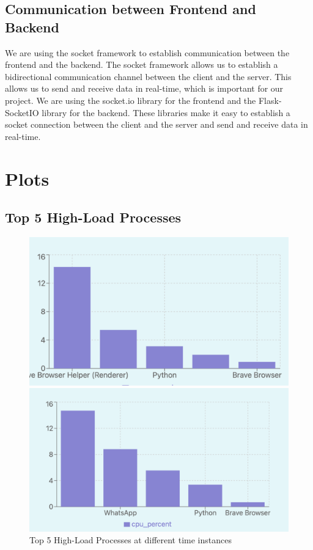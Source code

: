\documentclass[12pt]{article}
\begin{document}
\subsection{Communication between Frontend and Backend}
We are using the socket framework to establish communication between the frontend and the backend. The socket framework allows us to establish a bidirectional communication channel between the client and the server. This allows us to send and receive data in real-time, which is important for our project. We are using the socket.io library for the frontend and the Flask-SocketIO library for the backend. These libraries make it easy to establish a socket connection between the client and the server and send and receive data in real-time.

\section{Plots}
\subsection{Top 5 High-Load Processes}
\begin{figure}[H]
    \centering
    \begin{minipage}{0.45\textwidth}
        \centering
        \includegraphics[width=\textwidth]{logos and images/top5_1.png}
    \end{minipage}
    \hfill
    \begin{minipage}{0.45\textwidth}
        \centering
        \includegraphics[width=\textwidth]{logos and images/top5_2.png}
    \end{minipage}
    \caption{Top 5 High-Load Processes at different time instances}
\end{figure}
\end{document}
